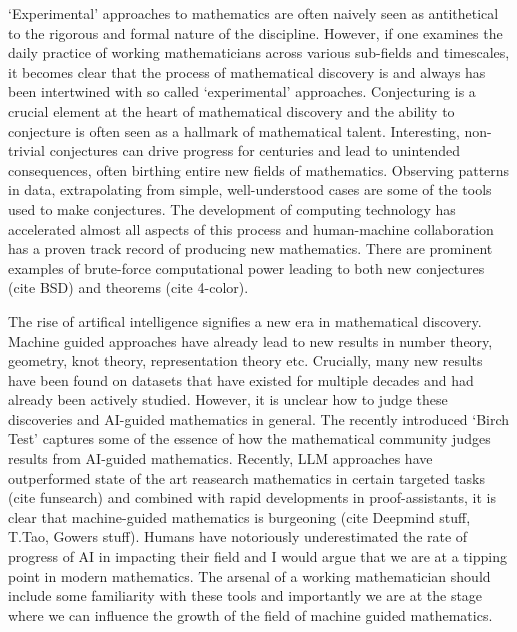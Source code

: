 `Experimental' approaches to mathematics are often naively seen as antithetical to the rigorous and formal nature of the discipline. However, if one examines the daily practice of working mathematicians across various sub-fields and timescales, it becomes clear that the process of mathematical discovery is and always has been intertwined with so called `experimental' approaches.
Conjecturing is a crucial element at the heart of mathematical discovery and the ability to conjecture is often seen as a hallmark of mathematical talent. Interesting, non-trivial conjectures can drive progress for centuries and lead to unintended consequences, often birthing entire new fields of mathematics. Observing patterns in data, extrapolating from simple, well-understood cases are some of the tools used to make conjectures.
The development of computing technology has accelerated almost all aspects of this process and human-machine collaboration has a proven track record of producing new mathematics. There are prominent examples of brute-force computational power leading to both new conjectures (cite {BSD}) and theorems (cite {4-color}). 
\par
The rise of artifical intelligence signifies a new era in mathematical discovery. Machine guided approaches have already lead to new results in number theory, geometry, knot theory, representation theory etc. Crucially, many new results have been found on datasets that have existed for multiple decades and had already been actively studied. However, it is unclear how to judge these discoveries and AI-guided mathematics in general. The recently introduced `Birch Test' \cite{heTrium2024} captures some of the essence of
how the mathematical community judges results from AI-guided mathematics.
Recently, LLM approaches have outperformed state of the art reasearch mathematics in certain 
targeted tasks (cite {funsearch}) and combined with rapid developments in proof-assistants, it is clear that machine-guided mathematics is burgeoning (cite {Deepmind stuff, T.Tao, Gowers stuff}).
Humans have notoriously underestimated the rate of progress of AI in impacting their field and I would argue that we are at a tipping point in modern mathematics. The arsenal of a working mathematician should include some familiarity with these tools and importantly we are at the stage where we can influence the growth of the field of machine guided mathematics.

